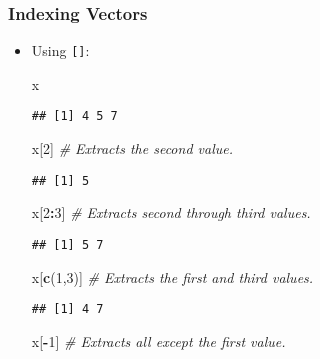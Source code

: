 \documentclass[
]{book}
\newenvironment{Shaded}{\begin{snugshade}}{\end{snugshade}}
\newcommand{\CommentTok}[1]{\textcolor[rgb]{0.56,0.35,0.01}{\textit{#1}}}
\newcommand{\DecValTok}[1]{\textcolor[rgb]{0.00,0.00,0.81}{#1}}
\newcommand{\KeywordTok}[1]{\textcolor[rgb]{0.13,0.29,0.53}{\textbf{#1}}}
\newcommand{\NormalTok}[1]{#1}
\newcommand{\OperatorTok}[1]{\textcolor[rgb]{0.81,0.36,0.00}{\textbf{#1}}}
\begin{document}
\hypertarget{indexing-vectors}{%
\subsubsection{Indexing Vectors}\label{indexing-vectors}}

\begin{itemize}
\item
  Using \texttt{{[}{]}}:

\begin{Shaded}
\begin{Highlighting}[]
\NormalTok{x}
\end{Highlighting}
\end{Shaded}

\begin{verbatim}
## [1] 4 5 7
\end{verbatim}

\begin{Shaded}
\begin{Highlighting}[]
\NormalTok{x[}\DecValTok{2}\NormalTok{] }\CommentTok{# Extracts the second value.}
\end{Highlighting}
\end{Shaded}

\begin{verbatim}
## [1] 5
\end{verbatim}

\begin{Shaded}
\begin{Highlighting}[]
\NormalTok{x[}\DecValTok{2}\OperatorTok{:}\DecValTok{3}\NormalTok{] }\CommentTok{# Extracts second through third values.}
\end{Highlighting}
\end{Shaded}

\begin{verbatim}
## [1] 5 7
\end{verbatim}

\begin{Shaded}
\begin{Highlighting}[]
\NormalTok{x[}\KeywordTok{c}\NormalTok{(}\DecValTok{1}\NormalTok{,}\DecValTok{3}\NormalTok{)] }\CommentTok{# Extracts the first and third values.}
\end{Highlighting}
\end{Shaded}

\begin{verbatim}
## [1] 4 7
\end{verbatim}

\begin{Shaded}
\begin{Highlighting}[]
\NormalTok{x[}\OperatorTok{-}\DecValTok{1}\NormalTok{] }\CommentTok{# Extracts all except the first value.}
\end{Highlighting}
\end{Shaded}


\end{itemize}
\end{document}
